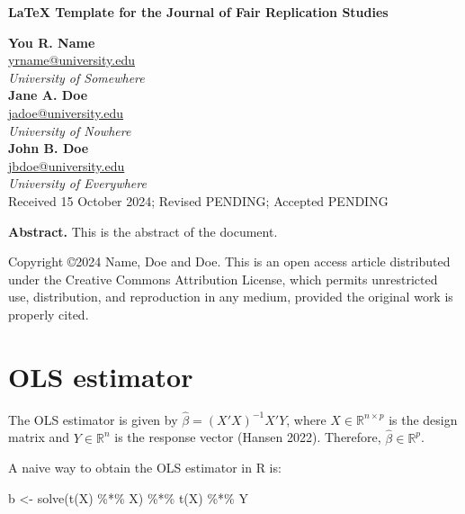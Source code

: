 \documentclass[letterpaper,twoside,12pt]{article}
\newenvironment{Shaded}{\begin{snugshade}}{\end{snugshade}}
\newcommand{\FunctionTok}[1]{\textcolor[rgb]{0.00,0.00,0.00}{#1}}
\newcommand{\NormalTok}[1]{#1}
\newcommand{\OtherTok}[1]{\textcolor[rgb]{0.56,0.35,0.01}{#1}}
\newcommand{\SpecialCharTok}[1]{\textcolor[rgb]{0.00,0.00,0.00}{#1}}
\begin{document}
\thispagestyle{firstpagefooter}

\begingroup  
\LARGE{\textbf{LaTeX Template for the Journal of Fair Replication
Studies}}\normalsize

\bigskip

  \textbf{You R. Name} \\
  \href{mailto:yrname@university.edu}{yrname@university.edu} \\
  \textit{University of Somewhere}\\
  \textbf{Jane A. Doe} \\
  \href{mailto:jadoe@university.edu}{jadoe@university.edu} \\
  \textit{University of Nowhere}\\
  \textbf{John B. Doe} \\
  \href{mailto:jbdoe@university.edu}{jbdoe@university.edu} \\
  \textit{University of Everywhere}\\

Received 15 October 2024; Revised PENDING; Accepted PENDING

\bigskip

\textbf{Abstract.} This is the abstract of the document.

Copyright \copyright 2024 Name, Doe and Doe. This is an open access
article distributed under the Creative Commons Attribution License,
which permits unrestricted use, distribution, and reproduction in any
medium, provided the original work is properly cited.
\endgroup

\section{OLS estimator}\label{ols-estimator}

The OLS estimator is given by \(\hat{\beta} = (X'X)^{-1}X'Y\), where
\(X \in \mathbb{R}^{n \times p}\) is the design matrix and
\(Y \in \mathbb{R}^n\) is the response vector (Hansen 2022). Therefore,
\(\hat{\beta} \in \mathbb{R}^p\).

A naive way to obtain the OLS estimator in R is:

\begin{Shaded}
\begin{Highlighting}[]
\NormalTok{b }\OtherTok{\textless{}{-}} \FunctionTok{solve}\NormalTok{(}\FunctionTok{t}\NormalTok{(X) }\SpecialCharTok{\%*\%}\NormalTok{ X) }\SpecialCharTok{\%*\%} \FunctionTok{t}\NormalTok{(X) }\SpecialCharTok{\%*\%}\NormalTok{ Y}
\end{Highlighting}
\end{Shaded}
\end{document}

